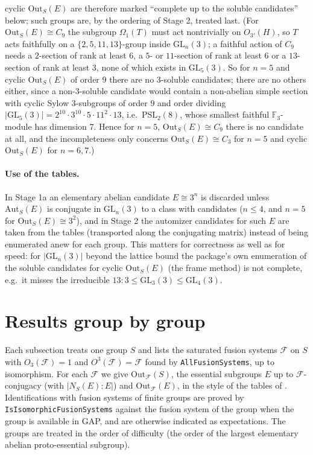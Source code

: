 \documentclass[11pt]{article}
\theoremstyle{definition}
\theoremstyle{remark}
\newcommand{\F}{\mathcal{F}}
\newcommand{\Aut}{\mathrm{Aut}}
\newcommand{\Out}{\mathrm{Out}}
\newcommand{\GL}{\mathrm{GL}}
\newcommand{\PSL}{\mathrm{PSL}}
\begin{document}
cyclic $\Out_S(E)$ are therefore marked ``complete up to the soluble
candidates'' below; such groups are, by the ordering of Stage 2, treated
last.  (For $\Out_S(E)\cong C_9$ the subgroup $\Omega_1(T)$ must act nontrivially
on $O_{3'}(H)$, so $T$ acts faithfully on a $\{2,5,11,13\}$-group inside
$\GL_n(3)$; a faithful action of $C_9$ needs a $2$-section of rank at least
$6$, a $5$- or $11$-section of rank at least $6$ or a $13$-section of rank at
least $3$, none of which exists in $\GL_5(3)$.  So for $n=5$ and cyclic
$\Out_S(E)$ of order $9$ there are no $3$-soluble candidates; there are no
others either, since a non-$3$-soluble candidate would contain a
non-abelian simple section with cyclic Sylow $3$-subgroups of order $9$
and order dividing $|\GL_5(3)|=2^{10}\cdot3^{10}\cdot5\cdot11^2\cdot13$,
i.e.\ $\PSL_2(8)$, whose smallest faithful $\mathbb{F}_3$-module has
dimension $7$.  Hence for $n=5$, $\Out_S(E)\cong C_9$ there is no candidate
at all, and the incompleteness only concerns $\Out_S(E)\cong C_3$ for $n=5$
and cyclic $\Out_S(E)$ for $n=6,7$.)

\paragraph{Use of the tables.}  In Stage 1a an elementary abelian candidate
$E\cong3^n$ is discarded unless $\Aut_S(E)$ is conjugate in $\GL_n(3)$ to a
class with candidates ($n\le4$, and $n=5$ for $\Out_S(E)\cong3^2$), and in
Stage 2 the automizer candidates for such $E$ are taken from the tables
(transported along the conjugating matrix) instead of being enumerated
anew for each group.  This matters for correctness as well as for speed: for
$|\GL_n(3)|$ beyond the lattice bound the package's own enumeration of the
soluble candidates for cyclic $\Out_S(E)$ (the frame method) is not
complete, e.g.\ it misses the irreducible $13{:}3\le\GL_3(3)\le\GL_4(3)$.


\section{Results group by group}\label{sec:results}

Each subsection treats one group $S$ and lists the saturated fusion
systems $\F$ on $S$ with $O_3(\F)=1$ and $O^3(\F)=\F$ found by
\texttt{AllFusionSystems}, up to isomorphism.  For each $\F$ we give
$\Out_\F(S)$, the essential subgroups $E$ up to $\F$-conjugacy (with
$|N_S(E):E|$) and $\Out_\F(E)$, in the style of the tables of \cite{PS}.
Identifications with fusion systems of finite groups are proved by
\texttt{IsIsomorphicFusionSystems} against the fusion system of the group
when the group is available in GAP, and are otherwise indicated as
expectations.  The groups are treated in the order of difficulty (the
order of the largest elementary abelian proto-essential subgroup).
\end{document}
